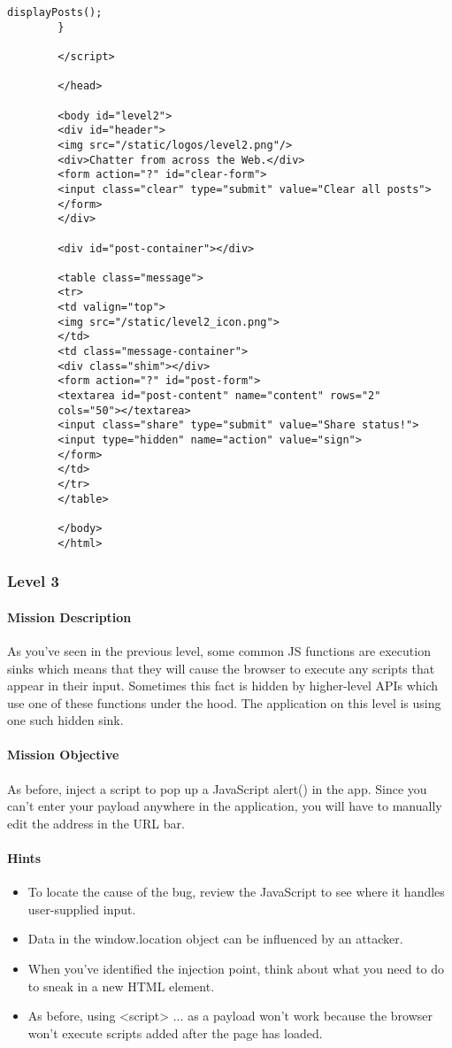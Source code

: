 \begin{Exercise}[label={websec-xss-game}]
\begin{lstlisting}[style=JavaScript]
		displayPosts();
		}
		
		</script>
		
		</head>
		
		<body id="level2">
		<div id="header">
		<img src="/static/logos/level2.png"/>
		<div>Chatter from across the Web.</div>
		<form action="?" id="clear-form">
		<input class="clear" type="submit" value="Clear all posts">
		</form>
		</div>
		
		<div id="post-container"></div>
		
		<table class="message">
		<tr>
		<td valign="top">
		<img src="/static/level2_icon.png">
		</td>
		<td class="message-container">
		<div class="shim"></div>
		<form action="?" id="post-form">
		<textarea id="post-content" name="content" rows="2"
		cols="50"></textarea>
		<input class="share" type="submit" value="Share status!">
		<input type="hidden" name="action" value="sign">
		</form>
		</td>
		</tr>
		</table>
		
		</body>
		</html>
		\end{lstlisting}
	\subsubsection{Level 3}
		\paragraph{Mission Description}
		As you've seen in the previous level, some common JS functions are execution sinks which means that they will cause the browser to execute any scripts that appear in their input. Sometimes this fact is hidden by higher-level APIs which use one of these functions under the hood. The application on this level is using one such hidden sink.
	
		\paragraph{Mission Objective}
		As before, inject a script to pop up a JavaScript alert() in the app. 
		Since you can't enter your payload anywhere in the application, you will have to manually edit the address in the URL bar.
		
		\paragraph{Hints}
		\begin{itemize}
			\item To locate the cause of the bug, review the JavaScript to see where it handles user-supplied input.
			\item Data in the window.location object can be influenced by an attacker.
			\item When you've identified the injection point, think about what you need to do to sneak in a new HTML element.
			\item As before, using <script> ... as a payload won't work because the browser won't execute scripts added after the page has loaded.
		\end{itemize}
		

\end{Exercise}
